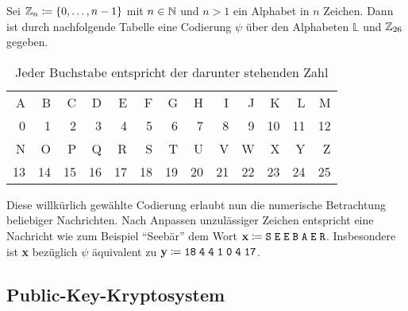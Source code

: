 \documentclass{paper}
\theoremstyle{classic}
\begin{document}
Sei \(\mathbb{Z}_n \coloneqq \{0,\dots,n - 1\}\) mit \(n \in \mathbb{N}\) und \(n > 1\) ein Alphabet in \(n\) Zeichen. Dann ist durch nachfolgende Tabelle eine Codierung \(\psi\) über den Alphabeten \(\mathbb{L}\) und \(\mathbb{Z}_{26}\) gegeben.
\begin{table}[ht]\renewcommand{\arraystretch}{\baselinestretch}\centering
\caption{Jeder Buchstabe entspricht der darunter stehenden Zahl}
\vspace{6pt}
{\ttfamily
\begin{tabular}{r r r r r r r r r r r r r}
A & B & C & D & E & F & G & H & I & J & K & L & M \\
0 & 1 & 2 & 3 & 4 & 5 & 6 & 7 & 8 & 9 & 10 & 11 & 12 \\
N & O & P & Q & R & S & T & U & V & W & X & Y & Z \\
13 & 14 & 15 & 16 & 17 & 18 & 19 & 20 & 21 & 22 & 23 & 24 & 25
\end{tabular}
}
\label{tab:1}
\end{table}

Diese willkürlich gewählte Codierung erlaubt nun die numerische Betrachtung beliebiger Nachrichten. Nach Anpassen unzulässiger Zeichen entspricht eine Nachricht wie zum Beispiel "`Seebär"' dem Wort \(\textbf{x} \coloneqq \texttt{S\;E\;E\;B\;A\;E\;R}\). Insbesondere ist \textbf{x} bezüglich \(\psi\) äquivalent zu \(\textbf{y} \coloneqq \texttt{18\;4\;4\;1\;0\;4\;17}\).

\subsection{Public-Key-Kryptosystem}
\end{document}
